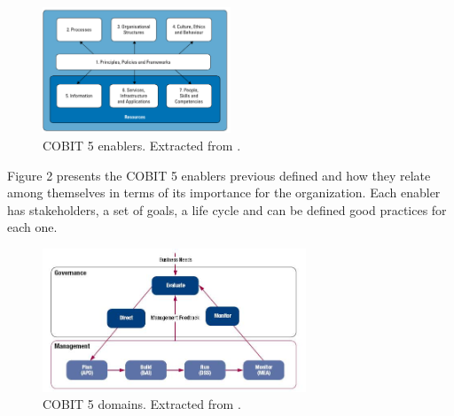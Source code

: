 \begin{figure}
\centering
\includegraphics[width=0.5\textwidth]{img/Enablers.png}
\caption{COBIT 5 enablers. Extracted from \cite{2012cobit}.}
\end{figure}

Figure 2 presents the COBIT 5 enablers previous defined and how they relate among themselves in terms of its importance for the organization. Each enabler has stakeholders, a set of goals, a life cycle and can be defined good practices for each one.\par

\begin{figure}
\centering
\includegraphics[width=0.7\textwidth]{img/COBITProcesses.jpg}
\caption{COBIT 5 domains. Extracted from \cite{2012cobit}.}
\end{figure}

